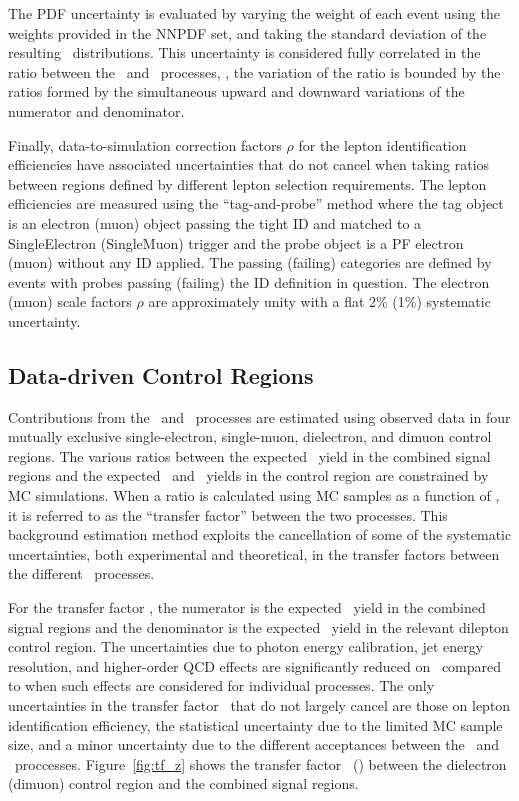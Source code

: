 The PDF uncertainty is evaluated by varying the weight of each event using the weights provided in the NNPDF set, and taking the standard deviation of the resulting \ETg\ distributions. 
This uncertainty is considered fully correlated in the ratio between the \zinvg\ and \wlng\ processes, \ie, the variation of the ratio is bounded by the ratios formed by the simultaneous upward and downward variations of the numerator and denominator.

Finally, data-to-simulation correction factors $\rho$ for the lepton identification efficiencies have associated uncertainties that do not cancel when taking ratios between regions defined by different lepton selection requirements.
The lepton efficiencies are measured using the ``tag-and-probe'' method where the tag object is an electron (muon) object passing the tight ID  and matched to a SingleElectron (SingleMuon) trigger and the probe object is a PF electron (muon) without any ID applied.
The passing (failing) categories are defined by events with probes passing (failing) the ID definition in question.
The electron (muon) scale factors $\rho$ are approximately unity with a flat 2\% (1\%) systematic uncertainty.

\subsection{Data-driven Control Regions}
\label{sec:control_regions}

Contributions from the \zinvg\ and \wlng\ processes are estimated using observed data in four mutually exclusive single-electron, single-muon, dielectron, and dimuon control regions.
The various ratios between the expected \zinvg\ yield in the combined signal regions and the expected \wlng\ and \zllg\ yields in the control region are constrained by MC simulations.
When a ratio is calculated using MC samples as a function of \ETg, it is referred to as the ``transfer factor'' between the two processes.
This background estimation method exploits the cancellation of some of the systematic uncertainties, both experimental and theoretical, in the transfer factors between the different  \vg\ processes.
 
For the transfer factor \RZll, the numerator is the expected \zinvg\ yield in the combined signal regions and the denominator is the expected \zllg\ yield in the relevant dilepton control region.
The uncertainties due to photon energy calibration, jet energy resolution, and higher-order QCD effects are significantly reduced on \RZll\ compared to when such effects are considered for individual processes. 
The only uncertainties in the transfer factor \RZll\ that do not largely cancel are those on lepton identification efficiency, the statistical uncertainty due to the limited MC sample size, and a minor uncertainty due to the different acceptances between the \zinvg\ and \zllg\ proccesses.  
Figure~\ref{fig:tf_z} shows the transfer factor \RZee\ (\RZmm) between the dielectron (dimuon) control region and the combined signal regions.

